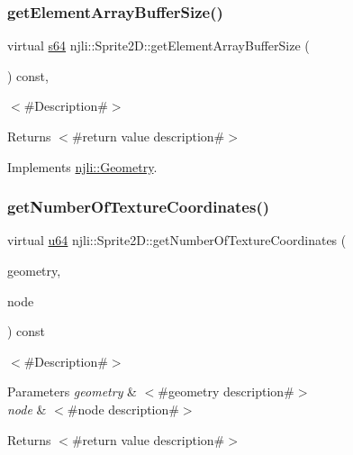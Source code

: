 \subsubsection{\texorpdfstring{get\+Element\+Array\+Buffer\+Size()}{getElementArrayBufferSize()}}
{\footnotesize\ttfamily virtual \mbox{\hyperlink{_util_8h_a4258bfb2c3a440d06c4aaa3c2b450dde}{s64}} njli\+::\+Sprite2\+D\+::get\+Element\+Array\+Buffer\+Size (\begin{DoxyParamCaption}{ }\end{DoxyParamCaption}) const\hspace{0.3cm}{\ttfamily [protected]}, {\ttfamily [virtual]}}

$<$\#\+Description\#$>$

\begin{DoxyReturn}{Returns}
$<$\#return value description\#$>$ 
\end{DoxyReturn}


Implements \mbox{\hyperlink{classnjli_1_1_geometry_ac857e830af897450652aee0922e62e20}{njli\+::\+Geometry}}.

\mbox{\label{classnjli_1_1_sprite2_d_a68ba69857ee4bb27dbf9072da12046ab}} 
\subsubsection{\texorpdfstring{get\+Number\+Of\+Texture\+Coordinates()}{getNumberOfTextureCoordinates()}}
{\footnotesize\ttfamily virtual \mbox{\hyperlink{_util_8h_ad758b7a5c3f18ed79d2fcd23d9f16357}{u64}} njli\+::\+Sprite2\+D\+::get\+Number\+Of\+Texture\+Coordinates (\begin{DoxyParamCaption}\item[{\mbox{\hyperlink{classnjli_1_1_level_of_detail}{Level\+Of\+Detail}} $\ast$}]{geometry,  }\item[{\mbox{\hyperlink{classnjli_1_1_node}{Node}} $\ast$}]{node }\end{DoxyParamCaption}) const\hspace{0.3cm}{\ttfamily [virtual]}}

$<$\#\+Description\#$>$


\begin{DoxyParams}{Parameters}
{\em geometry} & $<$\#geometry description\#$>$ \\
\hline
{\em node} & $<$\#node description\#$>$\\
\hline
\end{DoxyParams}
\begin{DoxyReturn}{Returns}
$<$\#return value description\#$>$ 
\end{DoxyReturn}


